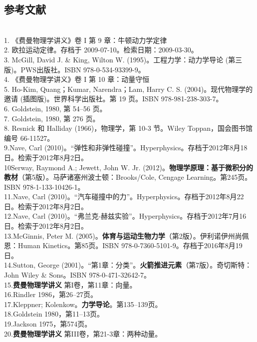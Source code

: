 \subsection{参考文献}\\
1. 《费曼物理学讲义》卷 I 第 9 章：牛顿动力学定律\\
2. 欧拉运动定律。存档于 2009-07-10。检索日期：2009-03-30。\\
3. McGill, David J. & King, Wilton W. (1995)。工程力学：动力学导论 (第三版)。PWS出版社。ISBN 978-0-534-93399-9。\\
4. 《费曼物理学讲义》卷 I 第 10 章：动量守恒\\
5. Ho-Kim, Quang；Kumar, Narendra；Lam, Harry C. S. (2004)。现代物理学的邀请 (插图版)。世界科学出版社。第 19 页。ISBN 978-981-238-303-7。\\
6. Goldstein, 1980, 第 54–56 页。\\
7. Goldstein, 1980, 第 276 页。\\
8. Resnick 和 Halliday (1966)，物理学，第 10-3 节。Wiley Toppan，国会图书馆编号 66-11527。\\
9.Nave, Carl (2010)。“弹性和非弹性碰撞”。Hyperphysics。存档于2012年8月18日。检索于2012年8月2日。\\
10Serway, Raymond A.; Jewett, John W. Jr. (2012)。\textbf{物理学原理：基于微积分的教材}（第5版）。马萨诸塞州波士顿：Brooks/Cole, Cengage Learning。第245页。ISBN 978-1-133-10426-1。\\
11.Nave, Carl (2010)。“汽车碰撞中的力”。Hyperphysics。存档于2012年8月22日。检索于2012年8月2日。\\
12.Nave, Carl (2010)。“弗兰克-赫兹实验”。Hyperphysics。存档于2012年7月16日。检索于2012年8月2日。\\
13.McGinnis, Peter M. (2005)。\textbf{体育与运动生物力学}（第2版）。伊利诺伊州尚佩恩：Human Kinetics。第85页。ISBN 978-0-7360-5101-9。存档于2016年8月19日。\\
14.Sutton, George (2001)。“第1章：分类”。\textbf{火箭推进元素}（第7版）。奇切斯特：John Wiley & Sons。ISBN 978-0-471-32642-7。\\
15.\textbf{费曼物理学讲义} 第I卷，第11章：向量。\\
16.Rindler 1986，第26–27页。\\
17.Kleppner; Kolenkow。\textbf{力学导论}。第135–139页。\\
18.Goldstein 1980，第11–13页。\\
19.Jackson 1975，第574页。\\
20.\textbf{费曼物理学讲义} 第III卷，第21-3章：两种动量。\\

